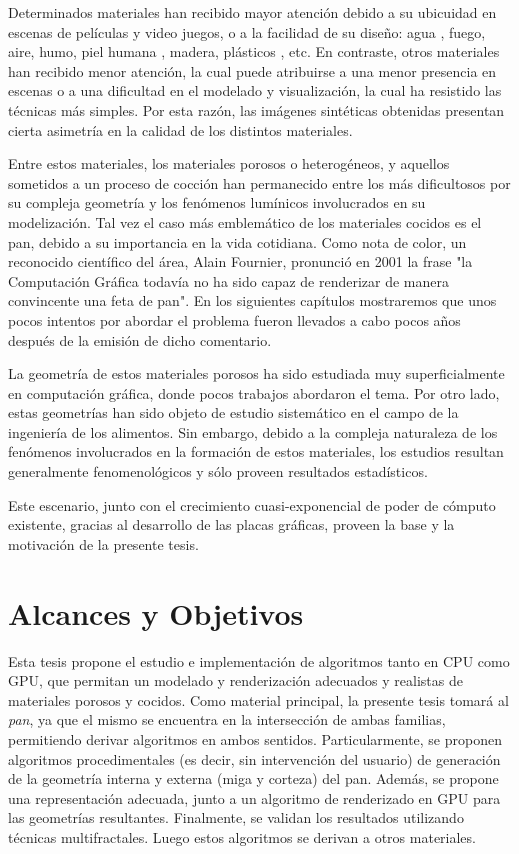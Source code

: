 Determinados materiales han recibido mayor atención debido a su ubicuidad en escenas de películas y video juegos, o a la facilidad de su diseño: agua \cite{Schechter2012}, fuego, aire, humo, piel humana \cite{Donner2006}, madera, plásticos \cite{Kurt2010}, etc.
En contraste, otros materiales han recibido menor atención, la cual puede atribuirse a una menor presencia en escenas o a una dificultad en el modelado y visualización, la cual ha resistido las técnicas más simples.
Por esta razón, las imágenes sintéticas obtenidas presentan cierta asimetría en la calidad de los distintos materiales.

Entre estos materiales, los materiales porosos o heterogéneos, y aquellos sometidos a un proceso de cocción han permanecido entre los más dificultosos por su compleja geometría y los fenómenos lumínicos involucrados en su modelización.
Tal vez el caso más emblemático de los materiales cocidos es el pan, debido a su importancia en la vida cotidiana.
Como nota de color, un reconocido  científico del área, Alain Fournier, pronunció en 2001 la frase "la Computación Gráfica todavía no ha sido capaz de renderizar de manera convincente una feta de pan".
En los siguientes capítulos mostraremos que unos pocos intentos por abordar el problema fueron llevados a cabo pocos años después de la emisión de dicho comentario.

La geometría de estos materiales porosos ha sido estudiada muy superficialmente en computación gráfica, donde pocos trabajos abordaron el tema.
Por otro lado, estas geometrías han sido objeto de estudio sistemático en el campo de la ingeniería de los alimentos.
Sin embargo, debido a la compleja naturaleza de los fenómenos involucrados en la formación de estos materiales, los estudios resultan generalmente fenomenológicos y sólo proveen resultados estadísticos.

Este escenario, junto con el crecimiento cuasi-exponencial de poder de cómputo existente, gracias al desarrollo de las placas gráficas, proveen la base y la motivación de la presente tesis.

\section{Alcances y Objetivos}
Esta tesis propone el estudio e implementación de algoritmos tanto en CPU como GPU, que permitan un modelado y renderización adecuados y realistas de materiales porosos y cocidos.
Como material principal, la presente tesis tomará al {\em pan}, ya que el mismo se encuentra en la intersección de ambas familias, permitiendo derivar algoritmos en ambos sentidos.
Particularmente, se proponen algoritmos procedimentales (es decir, sin intervención del usuario) de generación de la geometría interna y externa (miga y corteza) del pan.
Además, se propone una representación adecuada, junto a un algoritmo de renderizado en GPU para las geometrías resultantes.
Finalmente, se validan los resultados utilizando técnicas multifractales.
Luego estos algoritmos se derivan a otros materiales.

